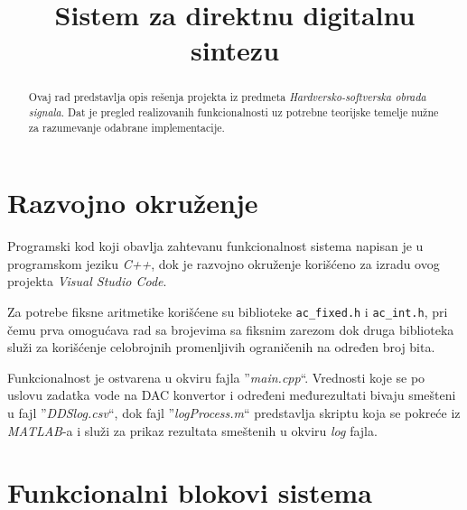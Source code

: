 \documentclass[conference]{IEEEtran}
\begin{document}
\title{Sistem za direktnu digitalnu sintezu}

\author{
\and
{}
}

\maketitle

\begin{abstract}
Ovaj rad predstavlja opis rešenja projekta iz predmeta \textit{Hardversko-softverska obrada signala}. Dat je pregled realizovanih funkcionalnosti uz potrebne teorijske temelje nužne za razumevanje odabrane implementacije.
\end{abstract}
\section{Razvojno okruženje}
Programski kod koji obavlja zahtevanu funkcionalnost sistema napisan je u programskom jeziku \textit{C++}, dok je razvojno okruženje korišćeno za izradu ovog projekta \textit{Visual Studio Code}.

Za potrebe fiksne aritmetike korišćene su biblioteke \texttt{ac\_fixed.h} i \texttt{ac\_int.h}, pri čemu prva omogućava rad sa brojevima sa fiksnim zarezom dok druga biblioteka služi za korišćenje celobrojnih promenljivih ograničenih na određen broj bita.

Funkcionalnost je ostvarena u okviru fajla ''\textit{main.cpp}``. Vrednosti koje se po uslovu zadatka vode na DAC konvertor i određeni međurezultati bivaju smešteni u fajl ''\textit{DDSlog.csv}``, dok fajl ''\textit{logProcess.m}`` predstavlja skriptu koja se pokreće iz \textit{MATLAB}-a i služi za prikaz rezultata smeštenih u okviru \textit{log} fajla.

\section{Funkcionalni blokovi sistema}
\end{document}
